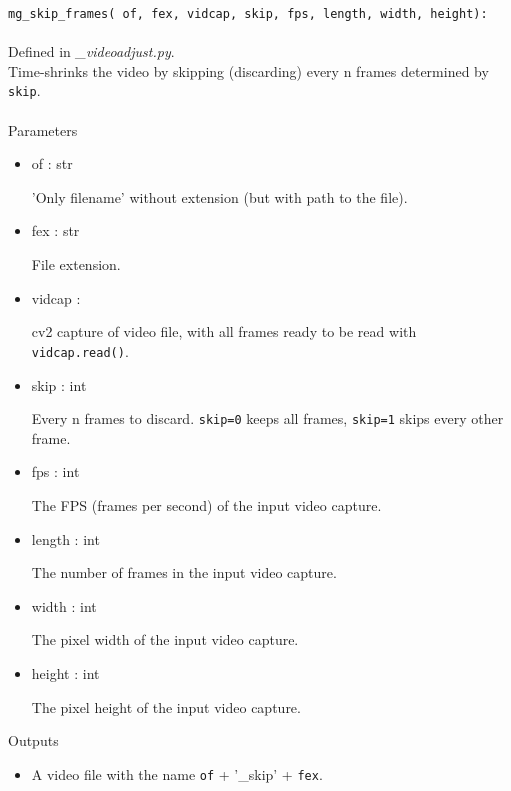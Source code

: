 \documentclass[9pt]{extarticle}
\def\code#1{\texttt{#1}}
\begin{document}
\code{mg\_skip\_frames(
    of, 
    fex, 
    vidcap, 
    skip, 
    fps, 
    length, 
    width, 
    height):}
\\\\
Defined in \textit{\_videoadjust.py}.\\
Time-shrinks the video by skipping (discarding) every n frames 
determined by \code{skip}.
\\\\

\noindent Parameters
\begin{itemize}
\item of : str

'Only filename' without extension (but with path to the file).

\item fex : str

File extension.

\item vidcap : 

cv2 capture of video file, with all frames ready to be 
read with \code{vidcap.read()}.
\item skip : int

Every n frames to discard. \code{skip=0} keeps all frames, 
\code{skip=1} skips every other frame.

\item fps : int

The FPS (frames per second) of the input video capture.

\item length : int

The number of frames in the input video capture.

\item width : int

The pixel width of the input video capture. 
\item height : int

The pixel height of the input video capture.
\end{itemize}

\noindent Outputs
\begin{itemize}
\item A video file with the name \code{of} + '\_skip' + \code{fex}.
\end{itemize}
\end{document}
